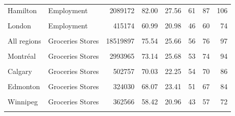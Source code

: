 \documentclass[Royal,times,sageh]{sagej}
\begin{document}
\begin{table}
{\begin{tabular}[t]{llrrrrrr}
Hamilton & Employment & 2089172 & 82.00 & 27.56 & 61 & 87 & 106\\
\addlinespace
\cellcolor{gray!10}{Waterloo} & \cellcolor{gray!10}{Employment} & \cellcolor{gray!10}{552826} & \cellcolor{gray!10}{70.77} & \cellcolor{gray!10}{26.62} & \cellcolor{gray!10}{49} & \cellcolor{gray!10}{69} & \cellcolor{gray!10}{93}\\
London & Employment & 415174 & 60.99 & 20.98 & 46 & 60 & 74\\
\cellcolor{gray!10}{Halifax} & \cellcolor{gray!10}{Employment} & \cellcolor{gray!10}{279178} & \cellcolor{gray!10}{65.96} & \cellcolor{gray!10}{25.45} & \cellcolor{gray!10}{47} & \cellcolor{gray!10}{65} & \cellcolor{gray!10}{84}\\
All regions & Groceries Stores & 18519897 & 75.54 & 25.66 & 56 & 76 & 97\\
\cellcolor{gray!10}{Toronto} & \cellcolor{gray!10}{Groceries Stores} & \cellcolor{gray!10}{8512874} & \cellcolor{gray!10}{79.56} & \cellcolor{gray!10}{25.34} & \cellcolor{gray!10}{61} & \cellcolor{gray!10}{82} & \cellcolor{gray!10}{101}\\
\addlinespace
Montréal & Groceries Stores & 2993965 & 73.14 & 25.68 & 53 & 74 & 94\\
\cellcolor{gray!10}{Vancouver} & \cellcolor{gray!10}{Groceries Stores} & \cellcolor{gray!10}{4540106} & \cellcolor{gray!10}{72.84} & \cellcolor{gray!10}{25.37} & \cellcolor{gray!10}{53} & \cellcolor{gray!10}{74} & \cellcolor{gray!10}{93}\\
Calgary & Groceries Stores & 502757 & 70.03 & 22.25 & 54 & 70 & 86\\
\cellcolor{gray!10}{Ottawa} & \cellcolor{gray!10}{Groceries Stores} & \cellcolor{gray!10}{619791} & \cellcolor{gray!10}{72.19} & \cellcolor{gray!10}{24.41} & \cellcolor{gray!10}{55} & \cellcolor{gray!10}{72} & \cellcolor{gray!10}{91}\\
Edmonton & Groceries Stores & 324030 & 68.07 & 23.41 & 51 & 67 & 84\\
\addlinespace
\cellcolor{gray!10}{Québec City} & \cellcolor{gray!10}{Groceries Stores} & \cellcolor{gray!10}{234600} & \cellcolor{gray!10}{69.66} & \cellcolor{gray!10}{25.79} & \cellcolor{gray!10}{51} & \cellcolor{gray!10}{70} & \cellcolor{gray!10}{89}\\
Winnipeg & Groceries Stores & 362566 & 58.42 & 20.96 & 43 & 57 & 72\\
\cellcolor{gray!10}{Hamilton} & \cellcolor{gray!10}{Groceries Stores} & \cellcolor{gray!10}{281118} & \cellcolor{gray!10}{83.61} & \cellcolor{gray!10}{29.15} & \cellcolor{gray!10}{60} & \cellcolor{gray!10}{91} & \cellcolor{gray!10}{110}\\

\end{tabular}}
\end{table}
\end{document}
